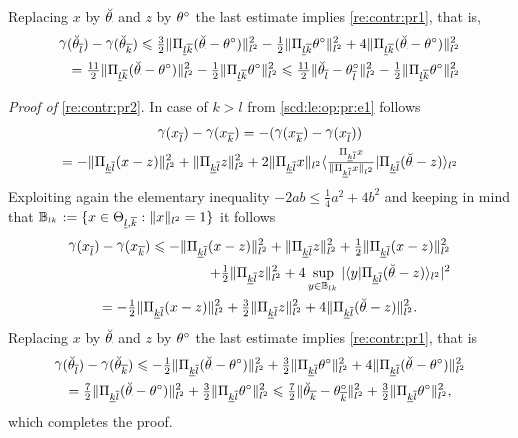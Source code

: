 \begin{pro}
 Replacing $x$ by $\dxdfPr[]$ and $z$ by $\xdf$ the last estimate
 implies \eqref{re:contr:pr1}, that is, 
\begin{multline*}
\contr[](\dxdfPr[l])-\contr[](\dxdfPr[k])
\leq \tfrac{3}{2}\Vnormlp{\dProj{k}{l}(\dxdfPr[]-\xdf)}^2-\tfrac{1}{2}
\Vnormlp{\dProj{k}{l}\xdf}^2 + 4 \Vnormlp{\dProj{k}{l}(\dxdfPr[]-\xdf)}^2\\
\hfill=\tfrac{11}{2}\Vnormlp{\dProj{k}{l}(\dxdfPr[]-\xdf)}^2-\tfrac{1}{2}
\Vnormlp{\dProj{k}{l}\xdf}^2%
\leq\tfrac{11}{2}\Vnormlp{\dxdfPr[l]-\xdfPr[l]}^2-\tfrac{1}{2}
\Vnormlp{\dProj{k}{l}\xdf}^2
\end{multline*}

\textit{Proof of} \eqref{re:contr:pr2}. In case of $k>l$  from
\eqref{scd:le:op:pr:e1} follows
\begin{multline*}
\contr[](x_{\overline{l}})-\contr[](x_{\overline{k}})=-(\contr[](x_{\overline{k}})-\contr[](x_{\overline{l}}))\\=-\Vnormlp{\dProj{l}{k}(x-z)}^2+\Vnormlp{\dProj{l}{k}z}^2+2\Vnormlp{\dProj{l}{k}x}\Vskalarlp{\tfrac{\dProj{l}{k}x}{\Vnormlp{\dProj{l}{k}x}}\vert \dProj{l}{k}(\dxdfPr[]-z)}
\end{multline*}
Exploiting again the elementary inequality $-2ab\leq \tfrac{1}{4}a^2+4b^2$
and keeping in mind that $\dmBaH{l}{k}:=\{x\in\dmHiH{l}{k}:\Vnormlp{x}=1\}$
it follows 
\begin{multline*}
\contr[](x_{\overline{l}})-\contr[](x_{\overline{k}})%
\leq-\Vnormlp{\dProj{l}{k}(x-z)}^2+\Vnormlp{\dProj{l}{k}z}^2+ \tfrac{1}{2}\Vnormlp{\dProj{l}{k}(x-z)}^2\\\hfill+ \tfrac{1}{2}\Vnormlp{\dProj{l}{k}z}^2 +
4\sup_{y\in\dmBaH{l}{k}} |\Vskalarlp{y\vert \dProj{l}{k}(\dxdfPr[]-z)}|^2\\
=-\tfrac{1}{2}\Vnormlp{\dProj{l}{k}(x-z)}^2+\tfrac{3}{2}\Vnormlp{\dProj{l}{k}z}^2+ 4 \Vnormlp{\dProj{l}{k}(\dxdfPr[]-z)}^2.
\end{multline*}
Replacing $x$ by $\dxdf$ and $z$ by $\xdf$ the last estimate
 implies \eqref{re:contr:pr1}, that is
\begin{multline*}
\contr[](\dxdfPr[l])-\contr[](\dxdfPr[k])
\leq -\tfrac{1}{2}\Vnormlp{\dProj{l}{k}(\dxdfPr[]-\xdf)}^2+\tfrac{3}{2}
\Vnormlp{\dProj{l}{k}\xdf}^2 + 4 \Vnormlp{\dProj{l}{k}(\dxdfPr[]-\xdf)}^2\\
=\tfrac{7}{2}\Vnormlp{\dProj{l}{k}(\dxdfPr[]-\xdf)}^2+\tfrac{3}{2}
\Vnormlp{\dProj{l}{k}\xdf}^2%
\leq \tfrac{7}{2}\Vnormlp{\dxdfPr[k]-\xdfPr[k]}^2+\tfrac{3}{2}\Vnormlp{\dProj{l}{k}\xdf}^2,
\end{multline*}
 which completes the proof.\proEnd
\end{pro}

